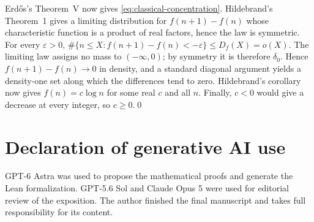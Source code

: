 \documentclass[11pt]{article}
\numberwithin{equation}{section}
\begin{document}
Erd\H{o}s's Theorem~V now gives
\eqref{eq:classical-concentration}. Hildebrand's Theorem~1 gives a limiting distribution for $f(n+1)-f(n)$
whose characteristic function \cite[(1.4)]{Hildebrand} is a product of
real factors, hence the law is symmetric. For every $\varepsilon>0$,
$\#\{n\le X:f(n+1)-f(n)<-\varepsilon\}\le D_f(X)=o(X)$.
The limiting law assigns no mass to $(-\infty,0)$; by symmetry it is
therefore $\delta_0$.
Hence $f(n+1)-f(n)\to0$ in density, and a standard diagonal argument
yields a density-one set along which the differences tend to zero.
Hildebrand's corollary \cite[pp.~258--259]{Hildebrand}
now gives $f(n)=c\log n$ for some real $c$ and all $n$.
Finally, $c<0$ would give a decrease at every integer, so $c\ge0$.\qed

\section*{Declaration of generative AI use}
GPT-6 Astra was used to propose the mathematical proofs and generate
the Lean formalization. GPT-5.6 Sol and Claude Opus 5 were used for
editorial review of the exposition. The author finished the final
manuscript and takes full responsibility for its content.
\end{document}
